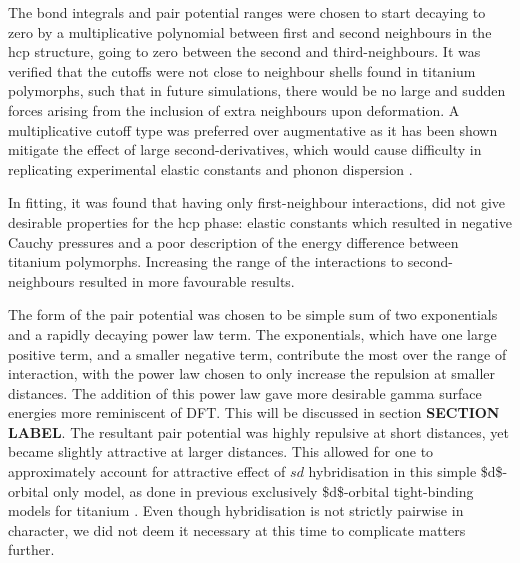 \documentclass[11pt]{article}
\begin{document}
The bond integrals and pair potential ranges were chosen to start
decaying to zero by a multiplicative polynomial between first and
second neighbours in the hcp structure, going to zero between the
second and third-neighbours. It was verified that the cutoffs were
not close to neighbour shells found in titanium
polymorphs, such that in future simulations, there would be no large
and sudden forces arising from the inclusion of extra neighbours
upon deformation. A multiplicative cutoff type was preferred over
augmentative as it has been shown mitigate the effect of large
second-derivatives, which would cause difficulty in replicating
experimental elastic constants and phonon dispersion
\cite{Pashov2012}.

In fitting, it was found that having only first-neighbour
interactions, did not give desirable properties for the hcp phase:
elastic constants which resulted in negative Cauchy pressures and a
poor description of the energy difference between titanium
polymorphs. Increasing the range of the interactions to
second-neighbours resulted in more favourable results.


The form of the pair potential was chosen to be simple sum of two
exponentials and a rapidly decaying power law term. The exponentials,
which have one large positive term, and a smaller negative term,
contribute the most over the range of interaction, with the power
law chosen to only increase the repulsion at smaller distances. The
addition of this power law gave more desirable gamma surface
energies more reminiscent of DFT. This will be discussed in section
\textbf{SECTION LABEL}. The resultant pair potential was highly repulsive
at short distances, yet became slightly
attractive at larger distances. This allowed for one to
approximately account for attractive effect of \(sd\) hybridisation
in this simple \$d\$-orbital only model, as done
in previous exclusively \$d\$-orbital tight-binding models for
titanium \cite{Girshick1998a}. Even though hybridisation is
not strictly pairwise in character, we did not deem it necessary at
this time to complicate matters further.
\end{document}
